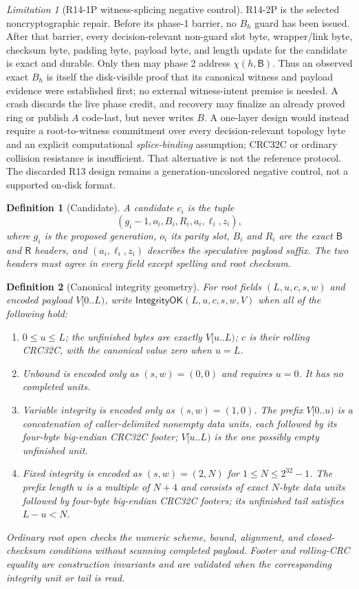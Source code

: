 \documentclass[10pt,twocolumn]{article}
\newtheorem{definition}{Definition}
\theoremstyle{remark}
\newtheorem{limitation}{Limitation}
\newcommand{\Root}{\mathsf{R}}
\newcommand{\Prepared}{\mathsf{B}}
\begin{document}
\begin{limitation}[R14-1P witness-splicing negative control]
R14-2P is the selected noncryptographic repair. Before its phase-1 barrier, no $B_h$ guard has been
issued. After that barrier, every decision-relevant non-guard slot byte, wrapper/link byte,
checksum byte, padding byte, payload byte, and length update for the candidate is exact and durable.
Only then may phase 2 address $\chi(h,\Prepared)$. Thus an observed exact $B_h$ is itself the
disk-visible proof that its canonical witness and payload evidence were established first; no
external witness-intent premise is needed. A crash discards the live phase credit, and recovery
may finalize an already proved ring or publish $A$ code-last, but never writes $B$. A one-layer
design would instead require a root-to-witness commitment over every decision-relevant topology
byte and an explicit computational \emph{splice-binding} assumption; CRC32C or ordinary collision
resistance is insufficient. That alternative is not the reference protocol. The discarded R13
design remains a generation-uncolored negative control, not a supported on-disk format.
\end{limitation}

\begin{definition}[Candidate]
A candidate $c_i$ is the tuple
\[
  (g_i-1,o_i,B_i,R_i,a_i,\ell_i,z_i),
\]
where $g_i$ is the proposed generation, $o_i$ its parity slot, $B_i$ and $R_i$ are the exact
$\Prepared$ and $\Root$ headers, and $(a_i,\ell_i,z_i)$ describes the speculative payload suffix.
The two headers must agree in every field except spelling and root checksum.
\end{definition}

\begin{definition}[Canonical integrity geometry]\label{def:integrity}
For root fields $(L,u,c,s,w)$ and encoded payload $V[0..L)$, write
$\mathsf{IntegrityOK}(L,u,c,s,w,V)$ when all of the following hold:
\begin{enumerate}
  \item $0\le u\le L$; the unfinished bytes are exactly $V[u..L)$; $c$ is their rolling CRC32C,
  with the canonical value zero when $u=L$.
  \item Unbound is encoded only as $(s,w)=(0,0)$ and requires $u=0$. It has no completed units.
  \item Variable integrity is encoded only as $(s,w)=(1,0)$. The prefix $V[0..u)$ is a
  concatenation of caller-delimited nonempty data units, each followed by its four-byte big-endian
  CRC32C footer; $V[u..L)$ is the one possibly empty unfinished unit.
  \item Fixed integrity is encoded as $(s,w)=(2,N)$ for $1\le N\le 2^{32}-1$.
  The prefix length $u$ is a multiple of $N+4$ and consists of exact $N$-byte data units followed
  by four-byte big-endian CRC32C footers; its unfinished tail satisfies $L-u<N$.
\end{enumerate}
Ordinary root open checks the numeric scheme, bound, alignment, and closed-checksum conditions
without scanning completed payload. Footer and rolling-CRC equality are construction invariants and
are validated when the corresponding integrity unit or tail is read.
\end{definition}
\end{document}
